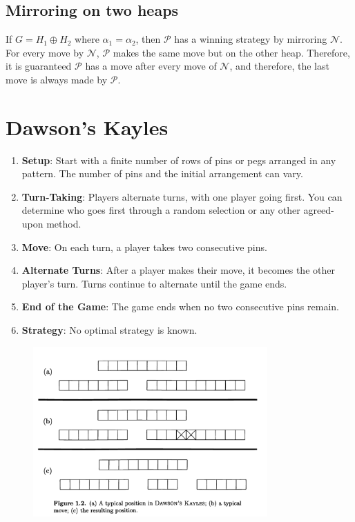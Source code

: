 \documentclass[12pt,oneside]{book}
\begin{document}
\subsection{Mirroring on two heaps}
If $G=H_1\oplus H_2$ where $\alpha_1= \alpha_2$, then $\mathcal P$ has a winning strategy by mirroring $\mathcal N$. For every move by $\mathcal N$, $\mathcal P$ makes the same move but on the other heap. Therefore, it is guaranteed $\mathcal P$ has a move after every move of $\mathcal N$, and therefore, the last move is always made by $\mathcal P$.



\section{Dawson's Kayles}
\begin{enumerate}
    \item \textbf{Setup}: Start with a finite number of rows of pins or pegs arranged in any pattern. The number of pins and the initial arrangement can vary.
  
    \item \textbf{Turn-Taking}: Players alternate turns, with one player going first. You can determine who goes first through a random selection or any other agreed-upon method.
  
    \item \textbf{Move}: On each turn, a player takes two consecutive pins.
  
    \item \textbf{Alternate Turns}: After a player makes their move, it becomes the other player's turn. Turns continue to alternate until the game ends.
  
    \item \textbf{End of the Game}: The game ends when no two consecutive pins remain.
    
    \item \textbf{Strategy}: No optimal strategy is known.
\end{enumerate}

\begin{figure}[ht]
    \centering
    \includegraphics[width=0.8\textwidth]{graphics/dk.png}
\end{figure}
\end{document}
